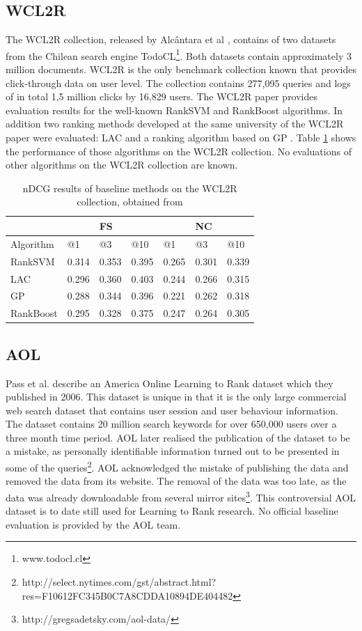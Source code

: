 \subsection{WCL2R}
The WCL2R collection, released by Alc{\^a}ntara et al \cite{Alcantara2010}, contains of two datasets from the Chilean search engine TodoCL\footnote{www.todocl.cl}. Both datasets contain approximately 3 million documents. WCL2R is the only benchmark collection known that provides click-through data on user level. The collection contains 277,095 queries and logs of in total 1,5 million clicks by 16,829 users. The WCL2R paper provides evaluation results for the well-known Rank\ac{SVM} \cite{Herbrich1999,Joachims2002} and RankBoost \cite{Freund2003} algorithms. In addition two ranking methods developed at the same university of the WCL2R paper were evaluated: LAC \cite{Veloso2008} and a ranking algorithm based on \ac{GP} \cite{DeAlmeida2007}. Table \ref{tab:results_WCL2R} shows the performance of those algorithms on the WCL2R collection. No evaluations of other algorithms on the WCL2R collection are known.

\begin{table}[!h]
\begin{tabular}{l|lll|lll}
 &  & FS &  &  & NC &  \\ 
\hline
Algorithm & @1 & @3 & @10 & @1 & @3 & @10 \\ 
\hline
RankSVM & 0.314 & 0.353 & 0.395 & 0.265 & 0.301 & 0.339 \\ 
LAC & 0.296 & 0.360 & 0.403 & 0.244 & 0.266 & 0.315 \\ 
GP & 0.288 & 0.344 & 0.396 & 0.221 & 0.262 & 0.318 \\ 
RankBoost & 0.295 & 0.328 & 0.375 & 0.247 & 0.264 & 0.305 \\ 
\end{tabular}
\caption{\acs{nDCG} results of baseline methods on the WCL2R collection, obtained from \cite{Alcantara2010}}
\label{tab:results_WCL2R}
\end{table}

\subsection{AOL}
Pass et al. \cite{Pass2006} describe an America Online Learning to Rank dataset which they published in 2006. This dataset is unique in that it is the only large commercial web search dataset that contains user session and user behaviour information. The dataset contains 20 million search keywords for over 650,000 users over a three month time period. AOL later realised the publication of the dataset to be a mistake, as personally identifiable information turned out to be presented in some of the queries\footnote{http://select.nytimes.com/gst/abstract.html?res=F10612FC345B0C7A8CDDA10894DE404482}. AOL acknowledged the mistake of publishing the data and removed the data from its website. The removal of the data was too late, as the data was already downloadable from several mirror sites\footnote{http://gregsadetsky.com/aol-data/}. This controversial AOL dataset is to date still used for Learning to Rank research. No official baseline evaluation is provided by the AOL team.

